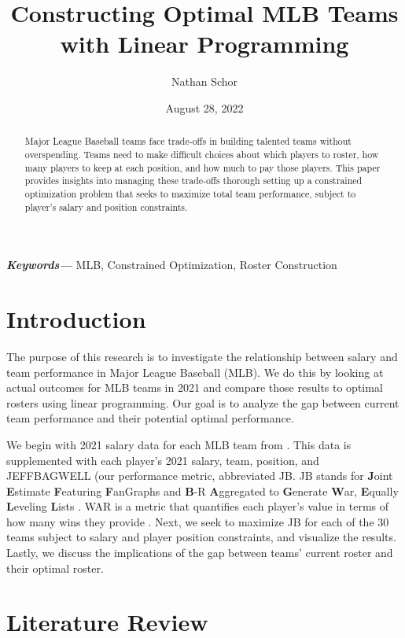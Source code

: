 \documentclass{article}
\title{Constructing Optimal MLB Teams with Linear Programming}
\author{Nathan Schor}
\date{August 28, 2022}
\begin{document}
\providecommand{\keywords}[1]
{
  \small	
  \textbf{\textit{Keywords---}} #1
}

\maketitle
\begin{abstract}
Major League Baseball teams face trade-offs in building talented teams without overspending. Teams need to make difficult choices about which players to roster, how many players to keep at each position, and how much to pay those players. This paper provides insights into managing these trade-offs thorough setting up a constrained optimization problem that seeks to maximize total team performance, subject to player's salary and position constraints. 
\end{abstract}
\keywords{MLB, Constrained Optimization, Roster Construction}
\newpage
\tableofcontents
\newpage
\section{Introduction}

The purpose of this research is to investigate the relationship between salary and team performance in Major League Baseball (MLB). We do this by looking at actual outcomes for MLB teams in 2021 and compare those results to optimal rosters using linear programming. Our goal is to analyze the gap between current team performance and their potential optimal performance. 

We begin with 2021 salary data for each MLB team from \cite{Brown2021}. This data is supplemented with each player's 2021 salary, team, position, and JEFFBAGWELL (our performance metric, abbreviated JB. JB stands for \textbf{J}oint \textbf{E}stimate \textbf{F}eaturing \textbf{F}anGraphs and \textbf{B}-R \textbf{A}ggregated to \textbf{G}enerate \textbf{W}ar, \textbf{E}qually \textbf{L}eveling \textbf{L}ists \cite{JB}. WAR is a metric that quantifies each player's value in terms of how many wins they provide \cite{WAR}. Next, we seek to maximize JB for each of the 30 teams subject to salary and player position constraints, and visualize the results. Lastly, we discuss the implications of the gap between teams' current roster and their optimal roster.

\section{Literature Review}
\end{document}
